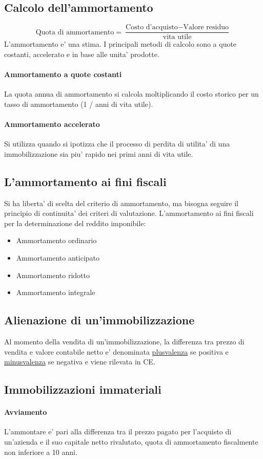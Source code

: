\documentclass{report}
\begin{document}
	\subsection{Calcolo dell'ammortamento}
	\[\text{Quota di ammortamento} = \dfrac{\text{Costo d'acquisto} - \text{Valore residuo}}{\text{vita utile}}\]
	L'ammortamento e' una stima. I principali metodi di calcolo sono a quote costanti, accelerato e in base alle unita' prodotte.
	\paragraph{Ammortamento a quote costanti} La quota annua di ammortamento si calcola moltiplicando il costo storico per un tasso di ammortamento (1 / anni di vita utile).
	\paragraph{Ammortamento accelerato} Si utilizza quando si ipotizza che il processo di perdita di utilita' di una immobilizzazione sia piu' rapido nei primi anni di vita utile.
	\subsection{L'ammortamento ai fini fiscali}
	Si ha liberta' di scelta del criterio di ammortamento, ma bisogna seguire il principio di continuita' dei criteri di valutazione. L'ammortamento ai fini fiscali per la determinazione del reddito imponibile:
	\begin{itemize}
		\item Ammortamento ordinario
		\item Ammortamento anticipato
		\item Ammortamento ridotto
		\item Ammortamento integrale
	\end{itemize}
	\subsection{Alienazione di un'immobilizzazione}
	Al momento della vendita di un'immobilizzazione, la differenza tra prezzo di vendita e valore contabile netto e' denominata \underline{plusvalenza} se positiva e \underline{minusvalenza} se negativa e viene rilevata in CE.
	\subsection{Immobilizzazioni immateriali}
	\paragraph{Avviamento} L'ammontare e' pari alla differenza tra il prezzo pagato per l'acquisto di un'azienda e il suo capitale netto rivalutato, quota di ammortamento fiscalmente non inferiore a 10 anni.
\end{document}
